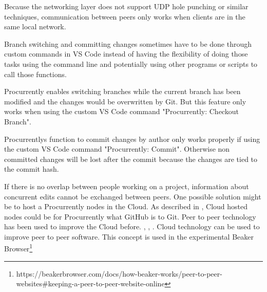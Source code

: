Because the networking layer does not support UDP hole punching \cite{10.1007/978-3-642-20798-3_1} or similar techniques, communication between peers only works when clients are in the same local network.

Branch switching and committing changes sometimes have to be done through custom commands in VS Code instead of having the flexibility of doing those tasks using the command line and potentially using other programs or scripts to call those functions.

Procurrently enables switching branches while the current branch has been modified and the changes would be overwritten by Git. But this feature only works when using the custom VS Code command "Procurrently: Checkout Branch".

Procurrentlys function to commit changes by author only works properly if using the custom VS Code command "Procurrently: Commit". Otherwise non committed changes will be lost after the commit because the changes are tied to the commit hash.

If there is no overlap between people working on a project, information about concurrent edits cannot be exchanged between peers.
One possible solution might be to host a Procurrently nodes in the Cloud. As described in \cite{6188603}, Cloud hosted nodes could be for Procurrently what GitHub is to Git. 
Peer to peer technology has been used to improve the Cloud before. \cite{Ranjan2013}, \cite{Ranjan2010}, \cite{Babaoglu:2012:DIP:2245276.2245357}. Cloud technology can be used to improve peer to peer software. This concept is used in the experimental Beaker Browser\footnote{https://beakerbrowser.com/docs/how-beaker-works/peer-to-peer-websites\#keeping-a-peer-to-peer-website-online}
